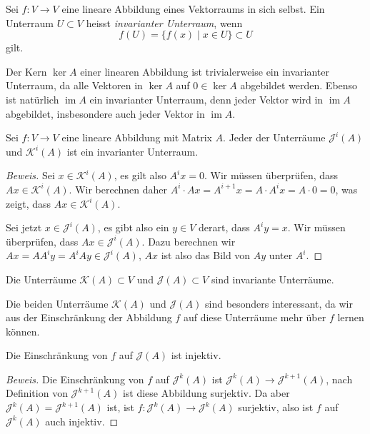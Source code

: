 \begin{definition}
Sei $f\colon V\to V$ eine lineare Abbildung eines Vektorraums in sich
selbst.
Ein Unterraum $U\subset V$ heisst {\em invarianter Unterraum},
wenn
\[
f(U) = \{ f(x)\;|\; x\in U\} \subset U
\]
gilt.
\end{definition}

Der Kern $\ker A$  einer linearen Abbildung ist trivialerweise ein
invarianter Unterraum, da alle Vektoren in $\ker A$ auf $0\in\ker A$
abgebildet werden.
Ebenso ist natürlich $\operatorname{im}A$ ein invarianter Unterraum,
denn jeder Vektor wird in $\operatorname{im}A$ abgebildet, insbesondere
auch jeder Vektor in $\operatorname{im}A$.

\begin{satz}
\label{buch:eigenwerte:satz:KJinvariant}
Sei $f\colon V\to V$ eine lineare Abbildung mit Matrix $A$.
Jeder der Unterräume $\mathcal{J}^i(A)$ und $\mathcal{K}^i(A)$ 
ist ein invarianter Unterraum.
\end{satz}

\begin{proof}[Beweis]
Sei $x\in\mathcal{K}^i(A)$, es gilt also $A^ix=0$.
Wir müssen überprüfen, dass $Ax\in\mathcal{K}^i(A)$.
Wir berechnen daher $A^i\cdot Ax=A^{i+1}x=A\cdot A^ix = A\cdot 0=0$,
was zeigt, dass $Ax\in\mathcal{K}^i(A)$.

Sei jetzt $x\in\mathcal{J}^i(A)$, es gibt also ein $y\in V$ derart, dass
$A^iy=x$.
Wir müssen überprüfen, dass $Ax\in\mathcal{J}^i(A)$.
Dazu berechnen wir $Ax=AA^iy=A^iAy\in\mathcal{J}^i(A)$, $Ax$ ist also das
Bild von $Ay$ unter $A^i$.
\end{proof}

\begin{korollar}
Die Unterräume $\mathcal{K}(A)\subset V$ und $\mathcal{J}(A)\subset V$
sind invariante Unterräume.
\end{korollar}

Die beiden Unterräume $\mathcal{K}(A)$ und $\mathcal{J}(A)$ sind besonders
interessant, da wir aus der Einschränkung der Abbildung $f$ auf diese
Unterräume mehr über $f$ lernen können.

\begin{satz}
\label{buch:eigenwerte:satz:fJinj}
Die Einschränkung von $f$ auf $\mathcal{J}(A)$ ist injektiv.
\end{satz}

\begin{proof}[Beweis]
Die Einschränkung von $f$ auf $\mathcal{J}^k(A)$ ist
$\mathcal{J}^k(A) \to \mathcal{J}^{k+1}(A)$, nach Definition von
$\mathcal{J}^{k+1}(A)$ ist diese Abbildung surjektiv.
Da aber $\mathcal{J}^k(A)=\mathcal{J}^{k+1}(A)$ ist, ist
$f\colon \mathcal{J}^k(A)\to\mathcal{J}^k(A)$ surjektiv,
also ist $f$ auf $\mathcal{J}^k(A)$ auch injektiv.
\end{proof}

